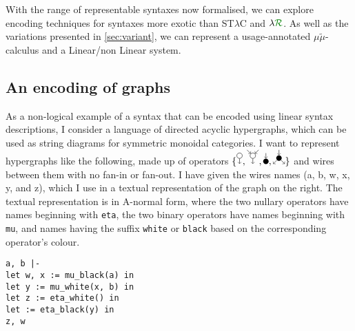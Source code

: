 With the range of representable syntaxes now formalised, we can explore encoding
techniques for syntaxes more exotic than ST$\lambda$C and $\name$.
As well as the variations presented in \cref{sec:variant}, we can represent a
usage-annotated $\mu\tilde\mu$-calculus and a Linear/non Linear system.

\subsection{An encoding of graphs}

As a non-logical example of a syntax that can be encoded using linear syntax
descriptions, I consider a language of directed acyclic hypergraphs, which can
be used as string diagrams for symmetric monoidal categories.
I want to represent hypergraphs like the following, made up of operators
$\{
\tikz{\node (n) [circle,draw,minimum size=2mm,inner sep=0] {};%
  \draw[->] (n) to (0,-3mm)},
\tikz{\node (n) [circle,draw,minimum size=2mm,inner sep=0] {};%
  \draw[->] (2.12mm,2.12mm) to (n); \draw[->] (-2.12mm,2.12mm) to (n);%
  \draw[->] (n) to (0,-3mm)},
\tikz{\node (n) [circle,fill,minimum size=2mm,inner sep=0] {};%
  \draw[->] (0,3mm) to (n)},
\tikz{\node (n) [circle,fill,minimum size=2mm,inner sep=0] {};%
  \draw[->] (n) to (2.12mm,-2.12mm); \draw[->] (n) to (-2.12mm,-2.12mm);%
  \draw[->] (0,3mm) to (n)}
\}$
and wires between them with no fan-in or fan-out.
I have given the wires names (a, b, w, x, y, and z), which I use in a textual
representation of the graph on the right.
The textual representation is in A-normal form, where the two nullary operators
have names beginning with \texttt{eta}, the two binary operators have names
beginning with \texttt{mu}, and names having the suffix \texttt{white} or
\texttt{black} based on the corresponding operator's colour.

\noindent
\begin{minipage}[t]{0.5\textwidth}
\end{minipage}
\begin{minipage}[t]{0.5\textwidth}
  \vspace{1.5em}
\begin{verbatim}
a, b |-
let w, x := mu_black(a) in
let y := mu_white(x, b) in
let z := eta_white() in
let := eta_black(y) in
z, w
\end{verbatim}
\end{minipage}


